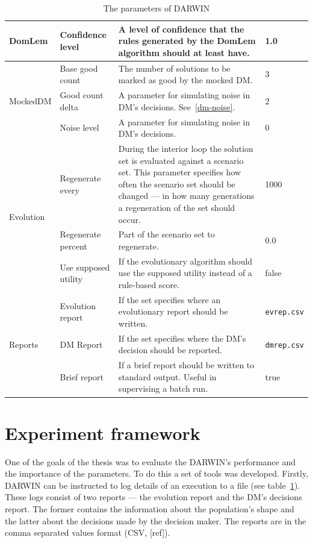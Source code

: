 \begin{table}
\begin{tabular}{l l p{7cm} l}
    \hline
    DomLem & Confidence level & A level of confidence that the rules generated by the
    DomLem algorithm should at least have. & 1.0 \\
    \hline
    \multirow{3}{*}{MockedDM} & Base good count & The number of solutions to be marked
    as good by the mocked DM. & 3 \\
    & Good count delta & A parameter for simulating noise in DM's decisions. See~\ref{dm-noise}. & 2 \\
    & Noise level & A parameter for simulating noise in DM's decisions. & 0 \\
    \hline
    \multirow{3}{*}{Evolution} & Regenerate every & During the interior loop
    the solution set is evaluated against a scenario set. This parameter
    specifies how often the scenario set should be changed --- in how many
    generations a regeneration of the set should occur. & 1000 \\
    & Regenerate percent & Part of the scenario set to regenerate. & 0.0 \\
    & Use supposed utility & If the evolutionary algorithm should use the
    supposed utility instead of a rule-based score. & false \\
    \hline
    \multirow{3}{*}{Reports} & Evolution report & If the set specifies where an
    evolutionary report should be written.  & \texttt{evrep.csv} \\
    & DM Report & If the set specifies where the DM's decision should be reported. & \texttt{dmrep.csv} \\
    &  Brief report & If a brief report should be written to standard
    output. Useful in supervising a batch run. & true \\
    \hline
  \end{tabular}
  \caption{The parameters of DARWIN}
  \label{t:params}
\end{table}


\section{Experiment framework}
One of the goals of the thesis was to evaluate the DARWIN's performance and
the importance of the parameters. To do this a set of tools was
developed. Firstly, DARWIN can be instructed to log details of an execution to
a file (see table~\ref{t:params}). These logs consist of two reports --- the
evolution report and the DM's decisions report. The former contains the
information about the population's shape and the latter about the decisions
made by the decision maker. The reports are in the comma separated values
format (CSV, [ref]).

